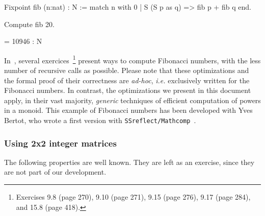 \begin{Coqsrc}
Fixpoint fib (n:nat) : N :=
  match n with
    0%
  | S (S p as q) => fib p + fib q
  end.

Compute fib 20.
\end{Coqsrc}

\begin{Coqanswer}
= 10946 : N
\end{Coqanswer}

In~\cite{BC04}, several exercices~\footnote{Exercises 9.8 (page 270), 9.10 (page 271), 9.15 (page 276), 9.17 (page 284), and 15.8 (page 418).}  
present ways to compute Fibonacci numbers, with the less number of recursive calls  as possible. Please note that these optimizations and the formal proof of their correctness are \emph{ad-hoc}, \emph{i.e.} exclusively written for the 
Fibonacci numbers.
In contrast, the optimizations we present in this document apply, in their vast majority, \emph{generic} techniques of efficient computation of powers in a monoid. 
This example of Fibonacci numbers has been developed with Yves Bertot, who wrote a first version with \texttt{SSreflect/Mathcomp}~\cite{MCB}.


\subsubsection{Using 2x2 integer matrices}

The following properties are well known. They are left as an exercise, since they are not part of our development. 


